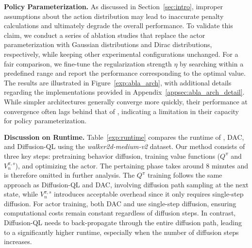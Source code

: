 \textbf{Policy Parameterization. }As discussed in Section~\ref{sec:intro}, improper assumptions about the action distribution may lead to inaccurate penalty calculations and ultimately degrade the overall performance. To validate this claim, we conduct a series of ablation studies that replace the actor parameterization with Gaussian distributions and Dirac distributions, respectively, while keeping other experimental configurations unchanged. For a fair comparison, we fine-tune the regularization strength $\eta$ by searching within a predefined range and report the performance corresponding to the optimal value. The results are illustrated in Figure~\ref{exp:abla_arch}, with additional details regarding the implementations provided in Appendix~\ref{appsec:abla_arch_detail}. While simpler architectures generally converge more quickly, their performance at convergence often lags behind that of \algbb, indicating a limitation in their capacity for policy parameterization. 

\textbf{Discussion on Runtime. }Table~\ref{exp:runtime} compares the runtime of \algbb, DAC, and Diffusion-QL using the \textit{walker2d-medium-v2} dataset. Our method consists of three key steps: pretraining behavior diffusion, training value functions ($Q^\pi$ and $V^{\pi,s}_n$), and optimizing the actor. The pertaining phase takes around 8 minutes and is therefore omitted in further analysis. The $Q^\pi$ training follows the same approach as Diffusion-QL and DAC, involving diffusion path sampling at the next state, while $V^{\pi,s}_n$ introduces acceptable overhead since it only requires single-step diffusion. For actor training, both DAC and \algbb use single-step diffusion, ensuring computational costs remain constant regardless of diffusion steps. In contrast, Diffusion-QL needs to back-propagate through the entire diffusion path, leading to a significantly higher runtime, especially when the number of diffusion steps increases.
